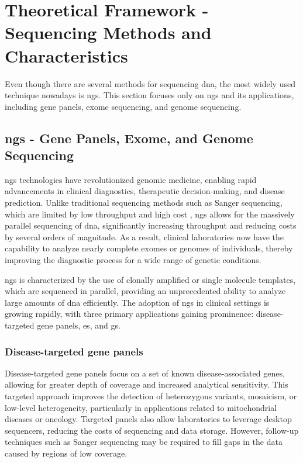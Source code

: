 \section{Theoretical Framework - Sequencing Methods and Characteristics} \label{sec:intro_sequencing}

Even though there are several methods for sequencing \ac{dna}, the most widely used technique nowadays is \acl{ngs}. This section focuses only on \ac{ngs} and its applications, including gene panels, exome sequencing, and genome sequencing.

\subsection{\acl{ngs} - Gene Panels, Exome, and Genome Sequencing} \label{subsec:ngs_gp_es_gs}


\acl{ngs} technologies have revolutionized genomic medicine, enabling rapid advancements in clinical diagnostics, therapeutic decision-making, and disease prediction. Unlike traditional sequencing methods such as Sanger sequencing, which are limited by low throughput and high cost \cite{cost}, \ac{ngs} allows for the massively parallel sequencing of \ac{dna}, significantly increasing throughput and reducing costs by several orders of magnitude. As a result, clinical laboratories now have the capability to analyze nearly complete exomes or genomes of individuals, thereby improving the diagnostic process for a wide range of genetic conditions. \cite{Rehm2013}

\ac{ngs} is characterized by the use of clonally amplified or single molecule templates, which are sequenced in parallel, providing an unprecedented ability to analyze large amounts of \ac{dna} efficiently. The adoption of \ac{ngs} in clinical settings is growing rapidly, with three primary applications gaining prominence: disease-targeted gene panels, \ac{es}, and \ac{gs}. \cite{Rehm2013}

\subsubsection{\textbf{Disease-targeted gene panels}} \label{subsubsubsec:ngs_panels}

Disease-targeted gene panels focus on a set of known disease-associated genes, allowing for greater depth of coverage and increased analytical sensitivity. This targeted approach improves the detection of heterozygous variants, mosaicism, or low-level heterogeneity, particularly in applications related to mitochondrial diseases or oncology. Targeted panels also allow laboratories to leverage desktop sequencers, reducing the costs of sequencing and data storage. However, follow-up techniques such as Sanger sequencing may be required to fill gaps in the data caused by regions of low coverage. \cite{Rehm2013}

